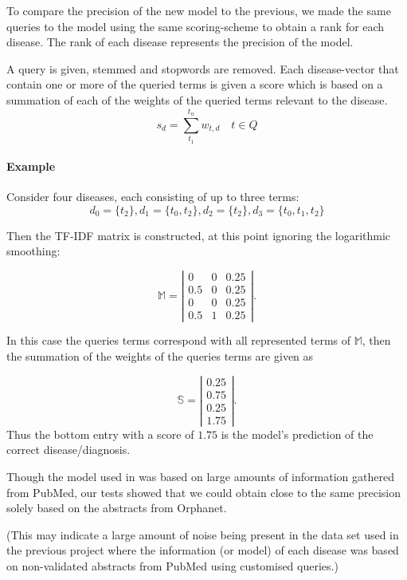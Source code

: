 \documentclass[10pt,letterpaper,final]{article}
\begin{document}
To compare the precision of the new model to the previous, we made the
same queries to the model using the same scoring-scheme to obtain a rank
for each disease. The rank of each disease represents the precision of
the model.

A query is given, stemmed and stopwords are removed. Each
disease-vector that contain one or more of the queried terms is given a
score which is based on a summation of each of the weights of the
queried terms relevant to the disease.
\[
s_{d} = \displaystyle\sum\limits_{t_1}^{t_n} w_{t,d}\quad t \in Q
\]

\paragraph{Example}
Consider four diseases, each consisting of up to three terms:
\[
d_{0} = \{t_{2}\}, d_{1} = \{t_{0}, t_{2} \}, d_{2} = \{t_{2} \}, d_{3} = \{t_{0}, t_{1}, t_{2} \}
\]

Then the TF-IDF matrix is constructed, at this point ignoring the
logarithmic smoothing:

\[ \mathbb{M} = \left| \begin{array}{ccc}
0 & 0 & 0.25 \\
0.5 & 0 & 0.25 \\
0 & 0 & 0.25 \\
0.5 & 1 & 0.25  \end{array} \right|.
\]

In this case the queries terms correspond with all represented terms of
$\mathbb{M}$, then the summation of the weights of the queries terms are
given as

\[ \mathbb{S} = \left| \begin{array}{c}
0.25 \\
0.75 \\
0.25 \\
1.75 \end{array} \right|.
\]
Thus the bottom entry with a score of $1.75$ is the model's prediction
of the correct disease/diagnosis. \newline


Though the model used in \cite{jensenandersen} was based on large
amounts of information gathered from PubMed, our tests showed that we
could obtain close to the same precision solely based on the abstracts
from Orphanet.

(This may indicate a large amount of noise being present
in the data set used in the previous project where the information (or
model) of each disease was based on non-validated abstracts from PubMed
using customised queries.)
\end{document}
